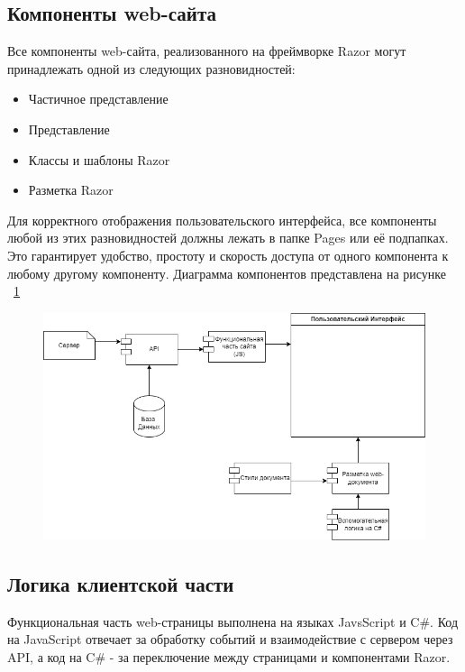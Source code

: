 \subsection{Компоненты web-сайта}
Все компоненты web-сайта, реализованного на фреймворке Razor могут принадлежать одной из следующих разновидностей:
\begin{itemize}
\item Частичное представление
\item Представление
\item Классы и шаблоны Razor
\item Разметка Razor
\end{itemize}
Для корректного отображения пользовательского интерфейса, все компоненты любой из этих разновидностей должны лежать в папке Pages или её подпапках. Это гарантирует удобство, простоту и скорость доступа от одного компонента к любому другому компоненту.
Диаграмма компонентов представлена на рисунке ~\ref{fig:comp}

\begin{figure}[H]
	\centering
	\includegraphics[width=1\linewidth]{images/comp}
	\caption{}
	\label{fig:comp}
\end{figure}

\subsection{Логика клиентской части}
Функциональная часть web-страницы выполнена на языках JavsScript и C\#. Код на JavaScript отвечает за обработку событий и взаимодействие с сервером через API, а код на C\# - за переключение между страницами и компонентами Razor.

